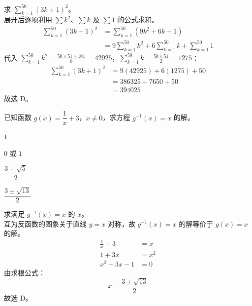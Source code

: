\documentclass[12pt,a4paper]{exam-zh}
\begin{document}
\begin{solution}
    求 $\displaystyle\sum_{k=1}^{50}(3k+1)^{2}$。 \\
    展开后逐项利用 $\sum k^{2}$、$\sum k$ 及 $\sum 1$ 的公式求和。
    \begin{align*}
        \sum_{k=1}^{50}(3k+1)^{2} &= \sum_{k=1}^{50}\left(9k^{2}+6k+1\right) \\
        &= 9\sum_{k=1}^{50}k^{2}+6\sum_{k=1}^{50}k+\sum_{k=1}^{50}1
    \end{align*}
    代入 $\displaystyle\sum_{k=1}^{50}k^{2}=\frac{50\times51\times101}{6}=42925$，$\displaystyle\sum_{k=1}^{50}k=\frac{50\times51}{2}=1275$：
    \begin{align*}
        \sum_{k=1}^{50}(3k+1)^{2} &= 9(42925)+6(1275)+50 \\
        &= 386325+7650+50 \\
        &= 394025
    \end{align*}
    故选 D。
\end{solution}

\begin{question}
    已知函数 $g(x)=\dfrac{1}{x}+3$，$x\neq0$，求方程 $g^{-1}(x)=x$ 的解。\paren[D]
    \begin{choices}
        \item $1$
        \item $0$ 或 $1$
        \item $\dfrac{3\pm\sqrt{5}}{2}$
        \item $\dfrac{3\pm\sqrt{13}}{2}$
    \end{choices}
\end{question}

\begin{solution}
    求满足 $g^{-1}(x)=x$ 的 $x$。 \\
    互为反函数的图象关于直线 $y=x$ 对称，故 $g^{-1}(x)=x$ 的解等价于 $g(x)=x$ 的解。
    \begin{align*}
        \frac{1}{x}+3 &= x \\
        1+3x &= x^{2} \\
        x^{2}-3x-1 &= 0
    \end{align*}
    由求根公式：
    \[
        x = \frac{3\pm\sqrt{13}}{2}
    \]
    故选 D。
\end{solution}
\end{document}
